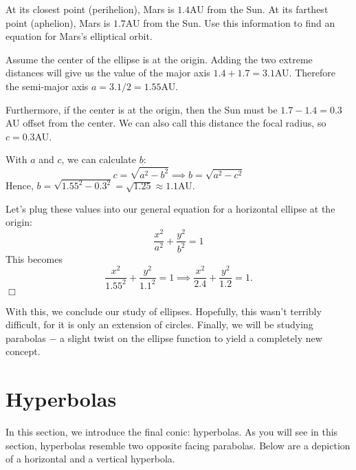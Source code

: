 \documentclass[lang=en,11pt]{elegantbook}
\begin{document}
\begin{example}
At its closest point (perihelion), Mars is $1.4$AU from the Sun.  At its farthest point (aphelion), Mars is $1.7$AU from the Sun.  Use this information to find an equation for Mars's elliptical orbit.
\end{example}
\begin{solution}
Assume the center of the ellipse is at the origin.  Adding the two extreme distances will give us the value of the major axis $1.4+1.7=3.1$AU.  Therefore the semi-major axis $a= 3.1/2 = 1.55$AU.  

Furthermore, if the center is at the origin, then the Sun must be $1.7-1.4=0.3$AU offset from the center.  We can also call this distance the focal radius, so $c=0.3$AU.  

With $a$ and $c$, we can calculate $b$:
$$ c = \sqrt{a^2-b^2} \implies b = \sqrt{a^2-c^2} $$
Hence, $b = \sqrt{1.55^2-0.3^2} = \sqrt{1.25} \approx 1.1$AU.  

Let's plug these values into our general equation for a horizontal ellipse at the origin:
$$ \frac{x^2}{a^2} + \frac{y^2}{b^2} = 1 $$
This becomes
$$ \frac{x^2}{1.55^2} + \frac{y^2}{1.1^2} = 1 \implies \frac{x^2}{2.4} + \frac{y^2}{1.2} = 1.$$ $\Box$
\end{solution}
With this, we conclude our study of ellipses.  Hopefully, this wasn't terribly difficult, for it is only an extension of circles.  Finally, we will be studying parabolas $-$ a slight twist on the ellipse function to yield a completely new concept.
\section{Hyperbolas}
\noindent In this section, we introduce the final conic: hyperbolas.  As you will see in this section, hyperbolas resemble two opposite facing parabolas. Below are a depiction of a horizontal and a vertical hyperbola.

\begin{figure}[!h]
    \centering
\end{figure}
\end{document}

